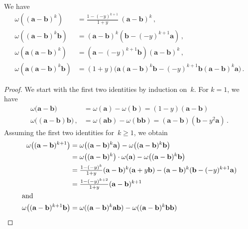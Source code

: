 \documentclass[10pt,a4paper]{amsart}
\newcommand{\aaa}{\mathbf{a}}
\newcommand{\bbb}{\mathbf{b}}
\begin{document}
\begin{lemma}
\label{lemma: omega evaluations}
    We have
    \begin{align*}
        \omega((\aaa-\bbb)^k) &= \tfrac{1-(-y)^{k+1}}{1+y} \ (\aaa-\bbb)^k \,, \\[5pt]
        \omega((\aaa-\bbb)^k \bbb) &= (\aaa-\bbb)^k(\bbb-(-y)^{k+1}\aaa) \,, \\[5pt]
        \omega(\aaa(\aaa-\bbb)^k) &= (\aaa-(-y)^{k+1} \bbb) (\aaa -\bbb)^k \,, \\[5pt]
        \omega(\aaa(\aaa-\bbb)^k \bbb) &= (1+y) \big(\aaa(\aaa -\bbb)^k\bbb -(-y)^{k+1} \bbb (\aaa -\bbb)^k \aaa \big) \,.
    \end{align*}
\end{lemma}

\begin{proof}
    We start with the first two identities by induction on~$k$.
    For $k=1$, we have
    \begin{align*}
        \omega\big(\aaa -\bbb\big) &= \omega(\aaa) - \omega(\bbb)= (1-y)(\aaa-\bbb) \\
        \omega\big((\aaa -\bbb)\bbb \big) \,,
        &= \omega(\aaa\bbb) -\omega(\bbb\bbb)
        = (\aaa - \bbb) (\bbb - y^2 \aaa) \,.
    \end{align*}
    Assuming the first two identities for~$k \geq 1$, we obtain
    \begin{align*}
        \omega\big((\aaa - \bbb)^{k+1}\big) 
        &= \omega\big((\aaa - \bbb)^k \aaa\big) - \omega\big((\aaa - \bbb)^k \bbb\big) \\
        &= \omega\big((\aaa - \bbb)^k\big) \cdot \omega(\aaa) - \omega\big((\aaa - \bbb)^k\bbb\big) \\
        &= \tfrac{1 - (-y)^k}{1 + y}(\aaa - \bbb)^k (\aaa + y \bbb) - (\aaa - \bbb)^k ( \bbb - (-y)^{k+1} \aaa) \\
        &= \tfrac{1 - (-y)^{k+2}}{1 + y}(\aaa - \bbb)^{k+1}  \\
        \intertext{and}
        \omega\big((\aaa - \bbb)^{k+1} \bbb\big)
        &= \omega((\aaa - \bbb)^k \aaa \bbb) - \omega((\aaa - \bbb)^k \bbb \bbb) \\

\end{align*}
\end{proof}
\end{document}
